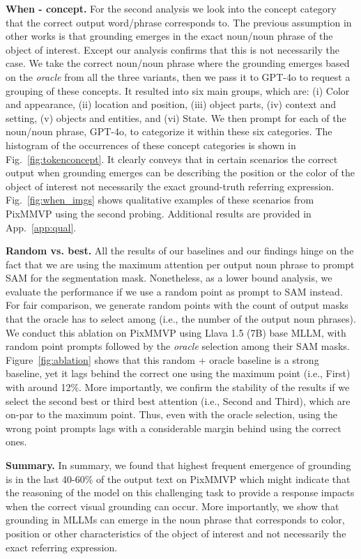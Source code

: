 \textbf{When - concept.} For the second analysis we look into the concept category that the correct output word/phrase corresponds to. The previous assumption in other works is that grounding emerges in the exact noun/noun phrase of the object of interest. Except our analysis confirms that this is not necessarily the case. We take the correct noun/noun phrase where the grounding emerges based on the \textit{oracle} from all the three variants, then we pass it to GPT-4o to request a grouping of these concepts. It resulted into six main groups, which are: (i) Color and appearance, (ii) location and position, (iii) object parts, (iv) context and setting, (v) objects and entities, and (vi) State. We then prompt for each of the noun/noun phrase, GPT-4o, to categorize it within these six categories. The histogram of the occurrences of these concept categories is shown in Fig.~\ref{fig:tokenconcept}. It clearly conveys that in certain scenarios the correct output when grounding emerges can be describing the position or the color of the object of interest not necessarily the exact ground-truth referring expression. Fig.~\ref{fig:when_imgs} shows qualitative examples of these scenarios from PixMMVP using the second probing. Additional results are provided in App.~\ref{app:qual}.

\textbf{Random vs. best.} All the results of our baselines and our findings hinge on the fact that we are using the maximum attention per output noun phrase to prompt SAM for the segmentation mask. Nonetheless, as a lower bound analysis, we evaluate the performance if we use a random point as prompt to SAM instead. For fair comparison, we generate random points with the count of output masks that the oracle has to select among (i.e., the number of the output noun phrases). We conduct this ablation on PixMMVP using Llava 1.5 (7B) base MLLM, with random point prompts followed by the \textit{oracle} selection among their SAM masks. Figure~\ref{fig:ablation} shows that this random + oracle baseline is a strong baseline, yet it lags behind the correct one using the maximum point (i.e., First) with around 12\%. More importantly, we confirm the stability of the results if we select the second best or third best attention (i.e., Second and Third), which are on-par to the maximum point. Thus, even with the oracle selection, using the wrong point prompts lags with a considerable margin behind using the correct ones. 

\textbf{Summary.} In summary, we found that highest frequent emergence of grounding is in the last 40-60\% of the output text on PixMMVP which might indicate that the reasoning of the model on this challenging task to provide a response impacts when the correct visual grounding can occur. More importantly, we show that grounding in MLLMs can emerge in the noun phrase that corresponds to color, position or other characteristics of the object of interest and not necessarily the exact referring expression. 